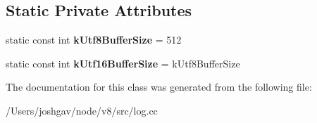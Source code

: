 \subsection*{Static Private Attributes}
\begin{DoxyCompactItemize}
\item 
static const int {\bfseries k\+Utf8\+Buffer\+Size} = 512\hypertarget{classv8_1_1internal_1_1_code_event_logger_1_1_name_buffer_ad1b771bd1eca7f742dd5efb22dc3bd16}{}\label{classv8_1_1internal_1_1_code_event_logger_1_1_name_buffer_ad1b771bd1eca7f742dd5efb22dc3bd16}

\item 
static const int {\bfseries k\+Utf16\+Buffer\+Size} = k\+Utf8\+Buffer\+Size\hypertarget{classv8_1_1internal_1_1_code_event_logger_1_1_name_buffer_af3ea9f7d9c2440b14c5d1b4161fa9227}{}\label{classv8_1_1internal_1_1_code_event_logger_1_1_name_buffer_af3ea9f7d9c2440b14c5d1b4161fa9227}

\end{DoxyCompactItemize}


The documentation for this class was generated from the following file\+:\begin{DoxyCompactItemize}
\item 
/\+Users/joshgav/node/v8/src/log.\+cc\end{DoxyCompactItemize}

